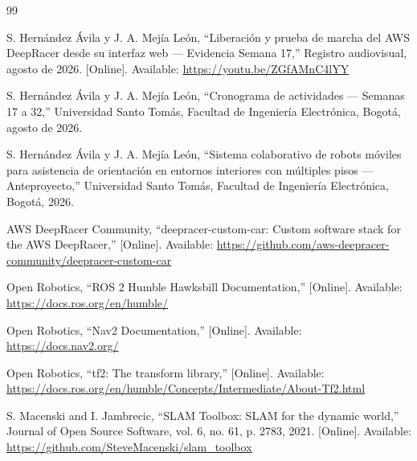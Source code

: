 \documentclass[12pt,letterpaper]{article}
\begin{document}
\begin{thebibliography}{99}

S. Hernández Ávila y J. A. Mejía León,
``Liberación y prueba de marcha del AWS DeepRacer desde su interfaz web --- Evidencia Semana 17,''
Registro audiovisual, agosto de 2026. [Online]. Available: \url{https://youtu.be/ZGfAMnC4lYY}

S. Hernández Ávila y J. A. Mejía León,
``Cronograma de actividades --- Semanas 17 a 32,''
Universidad Santo Tomás, Facultad de Ingeniería Electrónica, Bogotá, agosto de 2026.

S. Hernández Ávila y J. A. Mejía León,
``Sistema colaborativo de robots móviles para asistencia de orientación en entornos interiores con múltiples pisos --- Anteproyecto,''
Universidad Santo Tomás, Facultad de Ingeniería Electrónica, Bogotá, 2026.

AWS DeepRacer Community,
``deepracer-custom-car: Custom software stack for the AWS DeepRacer,''
[Online]. Available: \url{https://github.com/aws-deepracer-community/deepracer-custom-car}

Open Robotics,
``ROS 2 Humble Hawksbill Documentation,''
[Online]. Available: \url{https://docs.ros.org/en/humble/}

Open Robotics,
``Nav2 Documentation,''
[Online]. Available: \url{https://docs.nav2.org/}

Open Robotics,
``tf2: The transform library,''
[Online]. Available: \url{https://docs.ros.org/en/humble/Concepts/Intermediate/About-Tf2.html}

S. Macenski and I. Jambrecic,
``SLAM Toolbox: SLAM for the dynamic world,''
Journal of Open Source Software, vol. 6, no. 61, p. 2783, 2021. [Online]. Available: \url{https://github.com/SteveMacenski/slam_toolbox}

\end{thebibliography}
\end{document}
